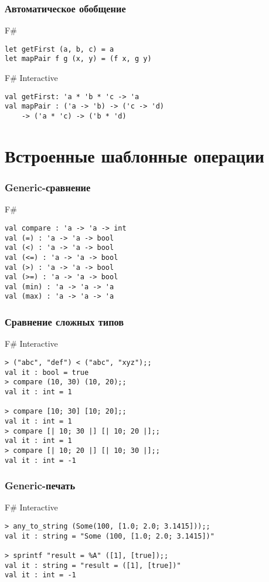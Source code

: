 \documentclass[xetex,mathserif,serif]{beamer}
\begin{document}
	\begin{frame}[fragile]
		\frametitle{Автоматическое обобщение}
		\begin{exampleblock}{F\#}
			\begin{lstlisting}
let getFirst (a, b, c) = a
let mapPair f g (x, y) = (f x, g y)
\end{lstlisting}
\end{exampleblock}

		\begin{alertblock}{F\# Interactive}
			\begin{lstlisting}
val getFirst: 'a * 'b * 'c -> 'a
val mapPair : ('a -> 'b) -> ('c -> 'd) 
    -> ('a * 'c) -> ('b * 'd)
\end{lstlisting}
\end{alertblock}
\end{frame}
	
	\section{Встроенные шаблонные операции}

	\begin{frame}[fragile]
		\frametitle{Generic-сравнение}
		\begin{exampleblock}{F\#}
			\begin{lstlisting}
val compare : 'a -> 'a -> int
val (=) : 'a -> 'a -> bool
val (<) : 'a -> 'a -> bool
val (<=) : 'a -> 'a -> bool
val (>) : 'a -> 'a -> bool
val (>=) : 'a -> 'a -> bool
val (min) : 'a -> 'a -> 'a
val (max) : 'a -> 'a -> 'a
\end{lstlisting}
\end{exampleblock}
\end{frame}

	\begin{frame}[fragile]
		\frametitle{Сравнение сложных типов}
		\begin{alertblock}{F\# Interactive}
			\begin{lstlisting}[keywordstyle=\color{black}]
> ("abc", "def") < ("abc", "xyz");;
val it : bool = true
> compare (10, 30) (10, 20);;
val it : int = 1

> compare [10; 30] [10; 20];;
val it : int = 1
> compare [| 10; 30 |] [| 10; 20 |];;
val it : int = 1
> compare [| 10; 20 |] [| 10; 30 |];;
val it : int = -1
\end{lstlisting}
\end{alertblock}
\end{frame}

	\begin{frame}[fragile]
		\frametitle{Generic-печать}
		\begin{alertblock}{F\# Interactive}
			\begin{lstlisting}[keywordstyle=\color{black}]
> any_to_string (Some(100, [1.0; 2.0; 3.1415]));;
val it : string = "Some (100, [1.0; 2.0; 3.1415])"

> sprintf "result = %A" ([1], [true]);;
val it : string = "result = ([1], [true])"
val it : int = -1
\end{lstlisting}
\end{alertblock}
\end{frame}
\end{document}
